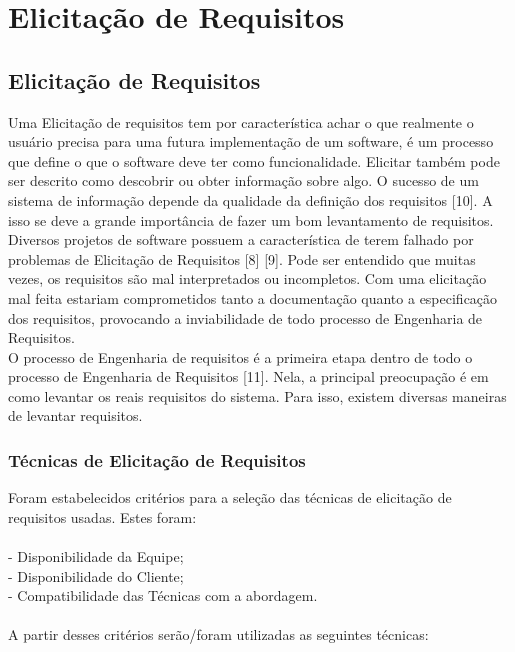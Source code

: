 \part{Elicitação de Requisitos}

\chapter[Elicitação de Requisitos]{Elicitação de Requisitos}

Uma Elicitação de requisitos tem por característica achar o que realmente o usuário precisa para uma futura implementação de um software, é um processo que define o que o software deve ter como funcionalidade. Elicitar também pode ser descrito como descobrir ou obter informação sobre algo. O sucesso de um sistema de informação depende da qualidade da definição dos requisitos [10]. A isso se deve a grande importância de fazer um bom levantamento de requisitos.\\
\tab Diversos projetos de software possuem a característica de terem falhado por problemas de Elicitação de Requisitos [8] [9]. Pode ser entendido que muitas vezes, os requisitos são mal interpretados ou incompletos. Com uma elicitação mal feita estariam comprometidos tanto a documentação quanto a especificação dos requisitos, provocando a inviabilidade de todo processo de Engenharia de Requisitos.\\
\tab O processo de Engenharia de requisitos é a primeira etapa dentro de todo o processo de Engenharia de Requisitos [11]. Nela, a principal preocupação é em como levantar os reais requisitos do sistema. Para isso, existem diversas maneiras de levantar requisitos. \\

\section{Técnicas de Elicitação de Requisitos}
\tab Foram estabelecidos critérios para a seleção das técnicas de elicitação de requisitos usadas. Estes foram:\\ \\
\tab - Disponibilidade da Equipe;\\
\tab - Disponibilidade do Cliente;\\
\tab - Compatibilidade das Técnicas com a abordagem.\\ \\
\tab A partir desses critérios serão/foram utilizadas as seguintes técnicas:\\

